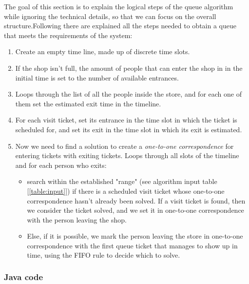 The goal of this section is to explain the logical steps of the queue algorithm while ignoring the technical details, so that we can focus on the overall structure.\newline Following there are explained all the steps needed to obtain a queue that meets the requirements of the system:

\begin{enumerate}[topsep=0pt]
    \item Create an empty time line, made up of discrete time slots.
    \item If the shop isn't full, the amount of people that can enter the shop in in the initial time is set to the number of available entrances.
    \item Loops through the list of all the people inside the store, and for each one of them set the estimated exit time in the timeline.
    \item For each visit ticket, set its entrance in the time slot in which the ticket is scheduled for, and set its exit in the time slot in which its exit is estimated.
    \item Now we need to find a solution to create a \textit{one-to-one correspondence} for entering tickets with exiting tickets.\newline
          Loops through all slots of the timeline and for each person who exits:
          \begin{itemize}
              \item search within the established "range" (see algorithm input table [\ref{table:input}]) if there is a scheduled visit ticket whose one-to-one correspondence hasn't already been solved.\newline
              If a visit ticket is found, then we consider the ticket solved, and we set it in one-to-one correspondence with the person leaving the shop.
              \item Else, if it is possible, we mark the person leaving the store in one-to-one correspondence with the first queue ticket that manages to show up in time, using the FIFO rule to decide which to solve.
          \end{itemize}
\end{enumerate}

\subsubsection{Java code}
\label{subsubsect:javacode}

